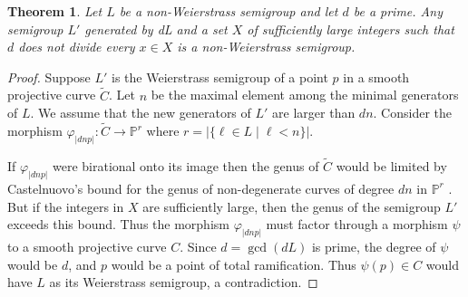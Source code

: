\documentclass[twoside,12pt, leqno]{amsart}
\newtheorem{theorem}{Theorem}[section]
\theoremstyle{definition}
\def\PP{{\mathbb P}}
\begin{document}
\begin{theorem}\label{torres}
Let $L$ be a non-Weierstrass semigroup and let $d$ be a prime. Any semigroup $L'$ generated by dL and a set
$X$ of  sufficiently large integers such that $d$ does not divide every $x\in X$ is  a non-Weierstrass semigroup.
\end{theorem}

\begin{proof} Suppose $L'$ is the Weierstrass semigroup of a point $p$ in a smooth projective curve $\widetilde C$.
Let $n$ be the maximal element among the minimal generators of $L$. We assume that the new generators of $L'$ are larger than $dn$. Consider the morphism $\varphi_{|dn p|}\colon \widetilde C \to \PP^{r}$ where $r=|\{\ell \in L \mid \ell<n\}|$.

 If $\varphi_{|dnp|}$ were birational onto its image then the genus of $\widetilde C$ would be limited by Castelnuovo's bound for the genus of non-degenerate curves of degree $dn$ in $\PP^{r}$ \cite[Theorem 10.4]{MR4898511}. But if the integers in $X$
are sufficiently large, then the genus of the semigroup $L'$ exceeds this bound. Thus the morphism $\varphi_{|dnp|}$ must factor 
through a morphism $\psi$  to a smooth projective curve $C$. Since $d = \gcd(dL)$ is prime,
the degree of $\psi$ would be $d$, and $p$ would be a point of total ramification.
Thus  $\psi (p)\in C$ would have $L$ as its Weierstrass semigroup, a contradiction.
\end{proof}
\end{document}
